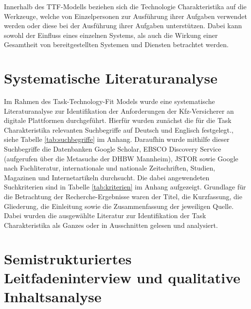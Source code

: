 Innerhalb des TTF-Modells beziehen sich die Technologie Charakteristika auf die Werkzeuge, welche von Einzelpersonen zur Ausführung ihrer Aufgaben verwendet werden oder diese bei der Ausführung ihrer Aufgaben unterstützen.\autocite[Vgl.][S. 399]{SPIES2020} Dabei kann sowohl der Einfluss eines einzelnen Systems, als auch die Wirkung einer Gesamtheit von bereitgestellten Systemen und Diensten betrachtet werden. \autocite[Vgl.][S. 216]{GOODHUE1995}





\section{Systematische Literaturanalyse}


Im Rahmen des Task-Technology-Fit Models wurde eine systematische Literaturanalyse zur Identifikation der Anforderungen der Kfz-Versicherer an digitale Plattformen durchgeführt. Hierfür wurden zunächst die für die Task Charakteristika relevanten Suchbegriffe auf Deutsch und Englisch festgelegt., siehe Tabelle \ref{tab:suchbegriffe} im Anhang. Daraufhin wurde mithilfe dieser Suchbegriffe die Datenbanken Google Scholar, EBSCO Discovery Service (aufgerufen über die Metasuche der DHBW Mannheim), JSTOR sowie Google nach Fachliteratur, internationale und nationale Zeitschriften, Studien, Magazinen und Internetartikeln  durchsucht. Die dabei angewendeten Suchkriterien sind in Tabelle \ref{tab:kriterien} im Anhang aufgezeigt. Grundlage für die Betrachtung der Recherche-Ergebnisse waren der Titel, die Kurzfassung, die Gliederung, die Einleitung sowie die Zusammenfassung der jeweiligen Quelle. Dabei wurden die ausgewählte Literatur zur Identifikation der Task Charakteristika als Ganzes oder in Ausschnitten gelesen und analysiert. \autocite[Vgl.][]{SOLIS2021}





\section{Semistrukturiertes Leitfadeninterview und qualitative Inhaltsanalyse}

